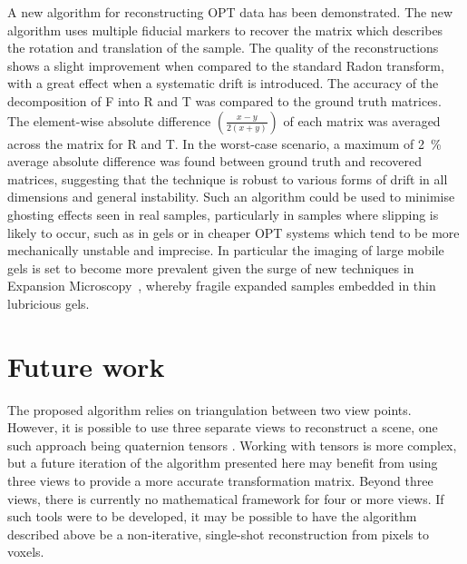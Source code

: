 \documentclass{osa-article}
\begin{document}
A new algorithm for reconstructing OPT data has been demonstrated.
The new algorithm uses multiple fiducial markers to recover the matrix which describes the rotation and translation of the sample.
The quality of the reconstructions shows a slight improvement when compared to the standard Radon transform, with a great effect when a systematic drift is introduced.
The accuracy of the decomposition of \gls*{F} into \gls*{R} and \gls*{T} was compared to the ground truth matrices.
The element-wise absolute difference \(\left(\frac{x-y}{2(x+y)}\right)\) of each matrix was averaged across the matrix for \gls*{R} and \gls*{T}.
In the worst-case scenario, a maximum of \SI{2}{\percent} average absolute difference was found between ground truth and recovered matrices,
suggesting that the technique is robust to various forms of drift in all dimensions and general instability.
Such an algorithm could be used to minimise ghosting effects seen in real samples, particularly in samples where slipping is likely to occur, such as in gels or in cheaper OPT systems which tend to be more mechanically unstable and imprecise.
In particular the imaging of large mobile gels is set to become more prevalent given the surge of new techniques in Expansion Microscopy~\cite{chenExpansionMicroscopy2015a}, whereby fragile expanded samples embedded in thin lubricious gels.

\section*{Future work}

The proposed algorithm relies on triangulation between two view points.
However, it is possible to use three separate views %
to reconstruct a scene, one such approach being quaternion tensors \cite{hartleyMultipleViewGeometry}.
Working with tensors is more complex, but a future iteration of the algorithm presented here may benefit from using three views to provide a more accurate transformation matrix.
Beyond three views, there is currently no mathematical framework for four or more views.
If such tools were to be developed, it may be possible to have the algorithm described above be a non-iterative, single-shot reconstruction from pixels to voxels.
\end{document}
